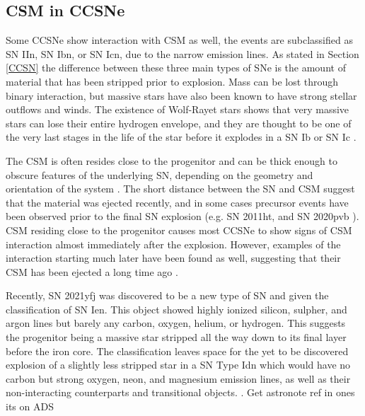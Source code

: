 \documentclass[a4paper,oneside,12pt, class=Latex/Classes/PhDthesisPSnPDF, crop=false]{standalone}
\begin{document}
\subsection{CSM in CCSNe}
Some CCSNe show interaction with CSM as well, the events are subclassified as SN IIn, SN Ibn, or SN Icn, due to the narrow emission lines. As stated in Section \ref{CCSN} the difference between these three main types of SNe is the amount of material that has been stripped prior to explosion. Mass can be lost through binary interaction, but massive stars have also been known to have strong stellar outflows and winds. The existence of Wolf-Rayet stars shows that very massive stars can lose their entire hydrogen envelope, and they are thought to be one of the very last stages in the life of the star before it explodes in a SN Ib or SN Ic \citep{WR_as_progenitors, 2019hgp}.

The CSM is often resides close to the progenitor and can be thick enough to obscure features of the underlying SN, depending on the geometry and orientation of the system \citep{1994W, PTF11iqb}. The short distance between the SN and CSM suggest that the material was ejected recently, and in some cases precursor events have been observed prior to the final SN explosion (e.g. SN 2011ht, \citealt{2011ht} and SN 2020pvb \citealt{2020pvb}). CSM residing close to the progenitor causes most CCSNe to show signs of CSM interaction almost immediately after the explosion. However, examples of the interaction starting much later have been found as well, suggesting that their CSM has been ejected a long time ago \citep{2008iy, late-CSM_IIn_Spitzer}.

Recently, SN 2021yfj was discovered to be a new type of SN and given the classification of SN Ien. This object showed highly ionized silicon, sulpher, and argon lines but barely any carbon, oxygen, helium, or hydrogen. This suggests the progenitor being a massive star stripped all the way down to its final layer before the iron core. The classification leaves space for the yet to be discovered explosion of a slightly less stripped star in a SN Type Idn which would have no carbon but strong oxygen, neon, and magnesium emission lines, as well as their non-interacting counterparts and transitional objects. \citep{Ien_disc}. \color{red} Get astronote ref in ones its on ADS \color{black}
\end{document}
